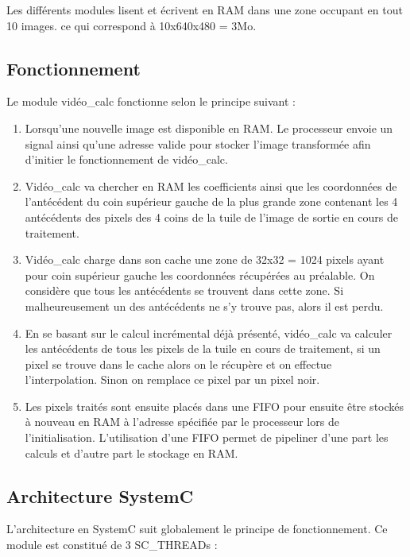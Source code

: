\documentclass[a4paper,12pt]{report}
\begin{document}
{{Les différents modules lisent et écrivent en RAM dans une zone occupant en tout 10 images. ce qui correspond à 10x640x480 = 3Mo.

	\subsection{Fonctionnement}

Le module vidéo\_calc fonctionne selon le principe suivant :

\begin{enumerate}

\item  Lorsqu'une nouvelle image est disponible en RAM. Le processeur envoie un signal ainsi qu'une adresse valide pour stocker l'image transformée afin d'initier le fonctionnement de vidéo\_calc.

\item Vidéo\_calc va chercher en RAM les coefficients ainsi que les coordonnées de l'antécédent du coin supérieur gauche de la plus grande zone contenant les 4 antécédents des pixels des 4 coins de la tuile de l'image de sortie en cours de traitement.

\item Vidéo\_calc charge dans son cache une zone de 32x32 = 1024 pixels ayant pour coin supérieur gauche les coordonnées récupérées au préalable. On considère que tous les antécédents se trouvent dans cette zone. Si malheureusement un des antécédents ne s'y trouve pas, alors il est perdu.

\item En se basant sur le calcul incrémental déjà présenté, vidéo\_calc va calculer les antécédents de tous les pixels de la tuile en cours de traitement, si un pixel se trouve dans le cache alors on le récupère et  on effectue l'interpolation. Sinon on remplace ce pixel par un pixel noir.

\item Les pixels traités sont ensuite placés dans une FIFO pour ensuite être stockés à nouveau en RAM à l'adresse spécifiée par le processeur lors de l'initialisation. L'utilisation d'une FIFO permet de pipeliner d'une part les calculs et d'autre part le stockage en RAM.

\end{enumerate}

	\subsection{Architecture SystemC}
L'architecture en SystemC suit globalement le principe de fonctionnement. Ce module est constitué de 3 SC\_THREADs :

}}
\end{document}
